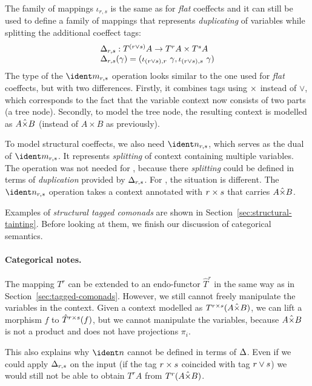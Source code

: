 The family of mappings $\iota_{r, s}$ is the same as for \emph{flat} coeffects
and it can still be used to define a family of mappings that represents \emph{duplicating}
of variables while splitting the additional coeffect tags:
%
\begin{equation*}
\begin{array}{l}
\Delta_{r, s} : T^{(r \vee s)}A \rightarrow T^r A \times T^s A\\
\Delta_{r, s}(\gamma) = (\iota_{(r\vee s), r}~\gamma, \iota_{(r\vee s), s}~\gamma)
\end{array}
\end{equation*}
%
The type of the $\cmerge_{r,s}$ operation looks similar to the one used for \emph{flat} coeffects,
but with two differences. Firstly, it combines tags using $\times$ instead of $\vee$, 
which corresponds to the fact that the variable context now consists of two parts (a tree node).
Secondly, to model the tree node, the resulting context is modelled as $A \hat{\times} B$
(instead of $A \times B$ as previously).

To model structural coeffects, we also need $\csplit_{r, s}$, which serves as the dual
of $\cmerge_{r, s}$. It represents \emph{splitting} of context containing multiple 
variables. The operation was not needed for \clflt, because there \emph{splitting} could
be defined in terms of \emph{duplication} provided by $\Delta_{r, s}$. For \clstr,
the situation is different. The $\csplit_{r, s}$ operation takes a context annotated
with $r \times s$ that carries $A \hat{\times} B$.

Examples of \emph{structural tagged comonads} are shown in Section~\ref{sec:structural-tainting}.
Before looking at them, we finish our discussion of categorical semantics.

\paragraph{Categorical notes.}
The mapping $T^r$ can be extended to an endo-functor $\hat{T}^r$ in the same way as in
Section~\ref{sec:tagged-comonads}. However, we still cannot freely manipulate the 
variables in the context. Given a context modelled as $T^{r \times s}(A \hat{\times} B)$,
we can lift a morphism $f$ to $\hat{T}^{r \times s}(f)$, but we cannot manipulate the
variables, because $A \hat{\times} B$ is not a product and does not have projections $\pi_i$.

This also explains why $\csplit$ cannot be defined in terms of $\Delta$. Even if we 
could apply $\Delta_{r, s}$ on the input (if the tag $r \times s$ coincided
with tag $r \vee s$) we would still not be able to obtain $T^r A$ from $T^r (A \hat{\times} B)$.

